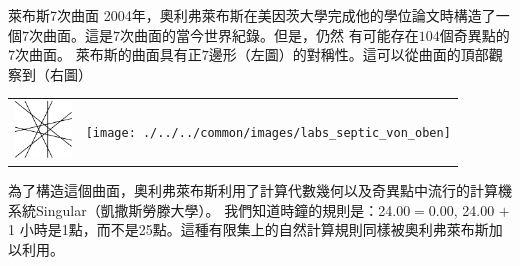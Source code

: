 \begin{surferPage}{萊布斯7次曲面}
2004年，奧利弗萊布斯在美因茨大學完成他的學位論文時構造了一個$7$次曲面。這是$7$次曲面的當今世界紀錄。但是，仍然
有可能存在$104$個奇異點的$7$次曲面。 萊布斯的曲面具有正$7$邊形（左圖）的對稱性。這可以從曲面的頂部觀察到（右圖）

    \vspace*{-0.3em}
    \begin{center}
      \begin{tabular}{c@{\qquad}c}
        \includegraphics[height=1.5cm]{./../../common/images/labsseptic1.pdf}
        &
        \texttt{[image: ./../../common/images/labs\_septic\_von\_oben]}
      \end{tabular}
    \end{center}
    \vspace*{-0.3em}

為了構造這個曲面，奧利弗萊布斯利用了計算代數幾何以及奇異點中流行的計算機系統{\sc Singular}（凱撒斯勞滕大學）。
我們知道時鐘的規則是：24.00$=$0.00, 24.00 $+$ 1 小時是1點，而不是25點。這種有限集上的自然計算規則同樣被奧利弗萊布斯加以利用。
\end{surferPage}
